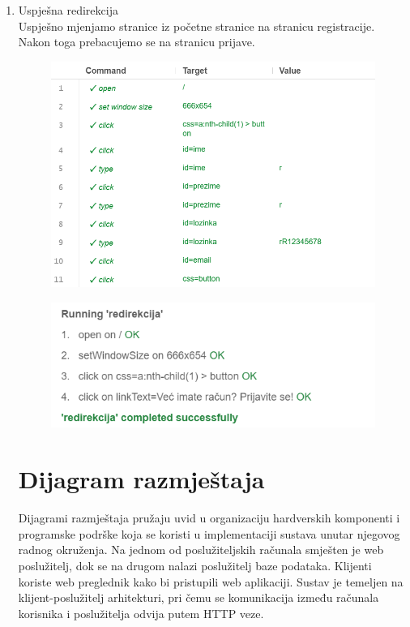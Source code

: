 \begin{enumerate}
    \item Uspješna redirekcija\\
     Uspješno mjenjamo stranice iz početne stranice na stranicu registracije. Nakon toga prebacujemo se na stranicu prijave.
    \begin{figure}[H]
        \includegraphics[scale=0.30]{slike/deploy/fTest4a.png}
        \centering
        \label{fig:promjene2}
    \end{figure}
    \begin{figure}[H]
        \includegraphics[scale=0.30]{slike/deploy/fTest4b.png}
        \centering
        \label{fig:promjene1}
    \end{figure}

    

  
		
		\eject
		\section{Dijagram razmještaja}

			Dijagrami razmještaja pružaju uvid u organizaciju hardverskih komponenti i programske podrške koja se koristi u implementaciji sustava unutar njegovog radnog okruženja. Na jednom od poslužiteljskih računala smješten je web poslužitelj, dok se na drugom nalazi poslužitelj baze podataka. Klijenti koriste web preglednik kako bi pristupili web aplikaciji. Sustav je temeljen na klijent-poslužitelj arhitekturi, pri čemu se komunikacija između računala korisnika i poslužitelja odvija putem HTTP veze.
			

\end{enumerate}
